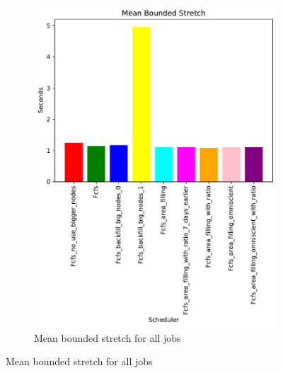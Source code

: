 \documentclass[a4paper]{article}
\begin{document}
\begin{figure}[H]\centering
\begin{subfigure}[b]{0.4\linewidth}\centering\includegraphics[width=0.95\linewidth]{MBSS/plot/Size_Constraint_2022-01-17->2022-01-17_V9271_Mean_Stretch_With_a_Minimum_450_128_32_256_4_1024.pdf}\caption{Mean bounded stretch for all jobs}\label{45}\end{subfigure}

\end{figure}
\end{document}
